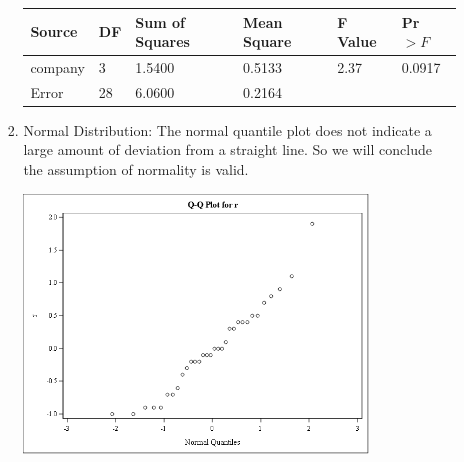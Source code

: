 \documentclass{article}
\begin{document}
\begin{enumerate}[leftmargin = 0 em, label = \arabic*., font = \bfseries]
\begin{enumerate}
\begin{enumerate}
\begin{center}
		\begin{tabular}{llllll}
		\toprule
		Source&DF&Sum of Squares&Mean Square&F Value&Pr $> F$\\
		\midrule
        company&3&1.5400&0.5133&2.37&0.0917\\
        Error&28&6.0600&0.2164&&\\
        \bottomrule
		\end{tabular}
		\end{center}

		\item 
		Normal Distribution: The normal quantile plot does not indicate a large amount of deviation from a straight line. So we will conclude the assumption of normality is valid.
		\vspace{\baselineskip}
		\begin{center}
		\includegraphics[width = 0.8\textwidth]{qqplot.png}
		\end{center}
	\end{enumerate}
	

		\end{enumerate}
\end{enumerate}
	
	
\end{document}
